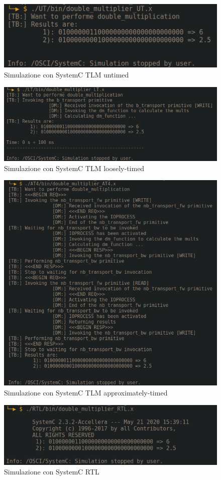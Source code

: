 \documentclass[]{IEEEtran}
\begin{document}
\begin{figure}[bt]
    \centering
    \includegraphics[width=\textwidth]{figures/SIM_TLM_UT.png}
    \caption{Simulazione con SystemC TLM untimed}
    \label{fig:SIM_TLM_UT}
\end{figure}

\begin{figure}[bt]
    \centering
    \includegraphics[width=\textwidth]{figures/SIM_TLM_LT.png}
    \caption{Simulazione con SystemC TLM loosely-timed}
    \label{fig:SIM_TLM_LT}
\end{figure}

\begin{figure}[bt]
    \centering
    \includegraphics[width=\textwidth]{figures/SIM_TLM_AT4.png}
    \caption{Simulazione con SystemC TLM approximately-timed}
    \label{fig:SIM_TLM_AT4}
\end{figure}

\begin{figure}[bt]
    \centering
    \includegraphics[width=\textwidth]{figures/SIM_RTL.png}
    \caption{Simulazione con SystemC RTL}
    \label{fig:SIM_RTL}
\end{figure}
\end{document}
